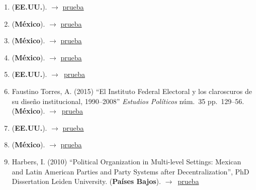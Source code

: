 \documentclass[12 pt, letter]{article}
\newenvironment{CitasMiTrabajo}{
    \begin{footnotesize}
    \begin{enumerate}[label={\footnotesize\emph{cita~\arabic*}},ref=\arabic*] %
        \setlength{\itemsep}{.1\itemsep}
        \setlength{\parskip}{.1\parskip}
    }{\end{enumerate}\end{footnotesize}}
\begin{document}
\begin{CitasMiTrabajo}
        \item {} (\textbf{EE.UU.}).  $\rightarrow$ \href{https://github.com/emagar/cv/blob/master/citasMiTrab/estevezEtalElecStud/diazDominguez2014phd.pdf}{prueba}

        \item {} (\textbf{M\'exico}).  $\rightarrow$ \href{https://github.com/emagar/cv/blob/master/citasMiTrab/estevezEtalElecStud/diazdominguezConfianzaElec2015nexos.pdf}{prueba}

        \item {} (\textbf{M\'exico}).  $\rightarrow$ \href{https://github.com/emagar/cv/blob/master/citasMiTrab/estevezEtalElecStud/diazDominguezTrifeGasto2016pl.pdf}{prueba}

        \item {} (\textbf{M\'exico}).  $\rightarrow$ \href{https://github.com/emagar/cv/blob/master/citasMiTrab/estevezEtalElecStud/diazSandoval2011phd.pdf}{prueba}

        \item {} (\textbf{EE.UU.}). $\rightarrow$~\href{https://github.com/emagar/cv/blob/master/citasMiTrab/estevezEtalElecStud/eisen.pdf}{prueba}

        \item Faustino Torres, A. (2015)
            ``El Instituto Federal Electoral y los claroscuros de su dise\~no institucional, 1990--2008''
            \emph{Estudios Pol\'iticos} n\'um.\ 35 pp.\ 129--56. (\textbf{M\'exico}). $\rightarrow$~\href{https://github.com/emagar/cv/blob/master/citasMiTrab/estevezEtalElecStud/faustino.excerpt.pdf}{prueba}

        \item {} (\textbf{EE.UU.}).  $\rightarrow$ \href{https://github.com/emagar/cv/blob/master/citasMiTrab/estevezEtalElecStud/fowler2010phd.pdf}{prueba}

        \item {} (\textbf{M\'exico}).  $\rightarrow$ \href{https://github.com/emagar/cv/blob/master/citasMiTrab/estevezEtalElecStud/garciaEscon2014phd.pdf}{prueba}

        \item Harbers, I. (2010)
            ``Political Organization	in Multi-level Settings: Mexican and Latin American Parties and Party Systems after Decentralization'', PhD Dissertation Leiden University. (\textbf{Pa\'ises Bajos}). $\rightarrow$~\href{https://github.com/emagar/cv/blob/master/citasMiTrab/estevezEtalElecStud/harbers.excerpt.pdf}{prueba}


\end{CitasMiTrabajo}
\end{document}
